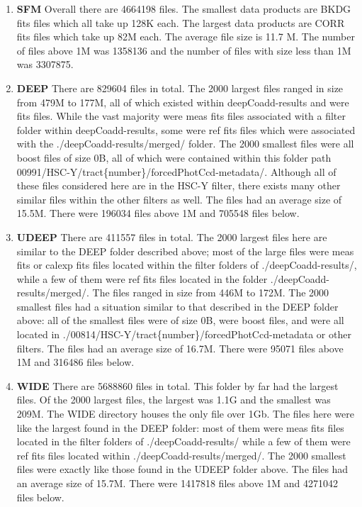 \documentclass[DM,authoryear,toc]{lsstdoc}
\begin{document}
\begin{enumerate}
\item
\textbf{SFM}
Overall there are 4664198 files.
The smallest data products are BKDG fits files which all take up 128K each.
The largest data products are CORR fits files which take up 82M each.
The average file size is 11.7 M. The number of files above 1M was 1358136 and the number of files with size less than 1M was 3307875.
\item
\textbf{DEEP}
There are 829604 files in total.
The 2000 largest files ranged in size from 479M to 177M, all of which existed within deepCoadd-results and were fits files. While the vast majority were meas fits files associated with a filter folder within deepCoadd-results, some were ref fits files which were associated with the ./deepCoadd-results/merged/ folder.
The 2000 smallest files were all boost files of size 0B, all of which were contained within this folder path 00991/HSC-Y/tract\{number\}/forcedPhotCcd-metadata/.
Although all of these files considered here are in the HSC-Y filter, there exists many other similar files within the other filters as well.
The files had an average size of 15.5M. There were 196034 files above 1M and 705548 files below.
\item
\textbf{UDEEP}
There are 411557 files in total.
The 2000 largest files here are similar to the DEEP folder described above; most of the large files were meas fits or calexp fits files located within the filter folders of ./deepCoadd-results/, while a few of them were ref fits files located in the folder ./deepCoadd-results/merged/.
The files ranged in size from 446M to 172M.
The 2000 smallest files had a situation similar to that described in the DEEP folder above: all of the smallest files were of size 0B, were boost files, and were all located in ./00814/HSC-Y/tract\{number\}/forcedPhotCcd-metadata or other filters.
The files had an average size of 16.7M. There were 95071 files above 1M and 316486 files below.
\item
\textbf{WIDE}
There are 5688860 files in total.
This folder by far had the largest files. Of the 2000 largest files, the largest was 1.1G and the smallest was 209M. The WIDE directory houses the only file over 1Gb. The files here were like the largest found in the DEEP folder: most of them were meas fits files located in the filter folders of ./deepCoadd-results/ while a few of them were ref fits files located within ./deepCoadd-results/merged/.
The 2000 smallest files were exactly like those found in the UDEEP folder above.
The files had an average size of 15.7M. There were 1417818 files above 1M and 4271042 files below.
\end{enumerate}
\end{document}
